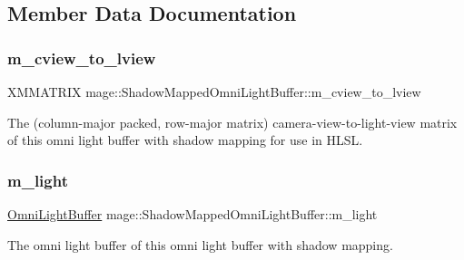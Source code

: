 \subsection{Member Data Documentation}
\hypertarget{structmage_1_1_shadow_mapped_omni_light_buffer_a3e31baf9bb0ba5f63199a1b84d7b43c9}{}\label{structmage_1_1_shadow_mapped_omni_light_buffer_a3e31baf9bb0ba5f63199a1b84d7b43c9} 
\subsubsection{\texorpdfstring{m\+\_\+cview\+\_\+to\+\_\+lview}{m\_cview\_to\_lview}}
{\footnotesize\ttfamily X\+M\+M\+A\+T\+R\+IX mage\+::\+Shadow\+Mapped\+Omni\+Light\+Buffer\+::m\+\_\+cview\+\_\+to\+\_\+lview}

The (column-\/major packed, row-\/major matrix) camera-\/view-\/to-\/light-\/view matrix of this omni light buffer with shadow mapping for use in H\+L\+SL. \hypertarget{structmage_1_1_shadow_mapped_omni_light_buffer_a57133d97178c513c237ac71fa86a2594}{}\label{structmage_1_1_shadow_mapped_omni_light_buffer_a57133d97178c513c237ac71fa86a2594} 
\subsubsection{\texorpdfstring{m\+\_\+light}{m\_light}}
{\footnotesize\ttfamily \hyperlink{structmage_1_1_omni_light_buffer}{Omni\+Light\+Buffer} mage\+::\+Shadow\+Mapped\+Omni\+Light\+Buffer\+::m\+\_\+light}

The omni light buffer of this omni light buffer with shadow mapping. \hypertarget{structmage_1_1_shadow_mapped_omni_light_buffer_ac375ef915a213716b0a1f7789bd4bf15}{}\label{structmage_1_1_shadow_mapped_omni_light_buffer_ac375ef915a213716b0a1f7789bd4bf15} 

